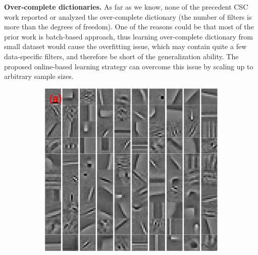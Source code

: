 {\bfseries Over-complete dictionaries.} As far as we know, none of the precedent CSC work reported or analyzed the over-complete dictionary (the number of filters is more than the degrees of freedom). One of the reasons could be that most of the prior work is batch-based approach, thus learning over-complete dictionary from small dataset would cause the overfitting issue, which may contain quite a few data-specific filters, and therefore be short of the generalization ability. The proposed online-based learning strategy can overcome this issue by scaling up to arbitrary sample sizes.

\begin{figure}[h]
\begin{minipage}{0.4\textwidth}
\begin{subfigure}{1\textwidth}
    \centering
  \includegraphics[width=0.6\linewidth]{figure/liu100-filter.pdf}
  \vspace*{2mm}
\end{subfigure}


\end{minipage}
\end{figure}
